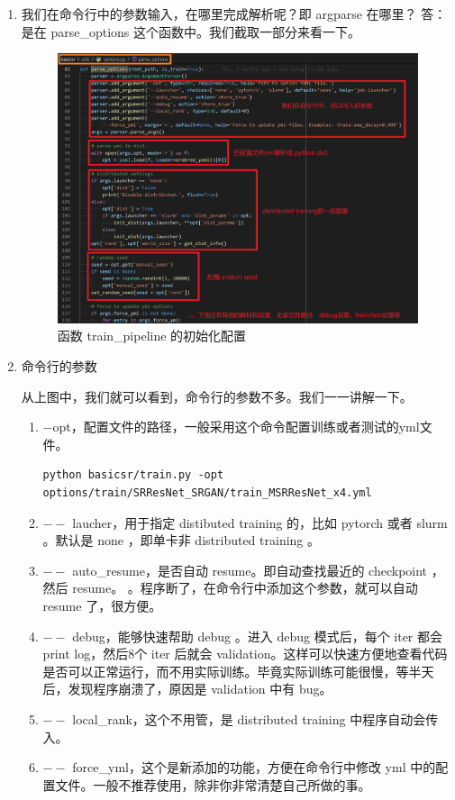 \documentclass[../main.tex]{subfiles}
\begin{document}
\begin{enumerate}
    \item 我们在命令行中的参数输入，在哪里完成解析呢？即 argparse 在哪里？
    答：是在 parse\_options 这个函数中。我们截取一部分来看一下。

\begin{figure}[H]
\begin{center}
    \includegraphics[width=0.7\linewidth]{figures/getting_start_3.png}
    \caption{函数 train\_pipeline 的初始化配置}
    \label{fig:getting_start_1}
\end{center}
\vspace{-0.5cm}
\end{figure}

\item 命令行的参数

从上图中，我们就可以看到，命令行的参数不多。我们一一讲解一下。

\begin{enumerate}

\item $-$opt，配置文件的路径，一般采用这个命令配置训练或者测试的yml文件。

\begin{verbatim}
python basicsr/train.py -opt options/train/SRResNet_SRGAN/train_MSRResNet_x4.yml
\end{verbatim}

\item $--$ laucher，用于指定 distibuted training 的，比如 pytorch 或者 slurm 。默认是 none ，即单卡非 distributed training 。
\item $--$ auto\_resume，是否自动 resume。即自动查找最近的 checkpoint ，然后 resume。 。程序断了，在命令行中添加这个参数，就可以自动 resume 了，很方便。
\item $--$ debug，能够快速帮助 debug 。进入 debug 模式后，每个 iter 都会 print log，然后8个 iter 后就会 validation。这样可以快速方便地查看代码是否可以正常运行，而不用实际训练。毕竟实际训练可能很慢，等半天后，发现程序崩溃了，原因是 validation 中有 bug。
\item $--$ local\_rank，这个不用管，是 distributed training 中程序自动会传入。
\item $--$ force\_yml，这个是新添加的功能，方便在命令行中修改 yml 中的配置文件。一般不推荐使用，除非你非常清楚自己所做的事。


\end{enumerate}
\end{enumerate}
\end{document}
